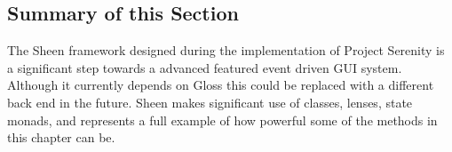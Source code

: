 \subsection{Summary of this Section}

The Sheen framework designed during the implementation of Project Serenity is a significant step towards a advanced featured event driven GUI system. Although it currently depends on Gloss this could be replaced with a different back end in the future. Sheen makes significant use of classes, lenses, state monads, and represents a full example of how powerful some of the methods in this chapter can be.
